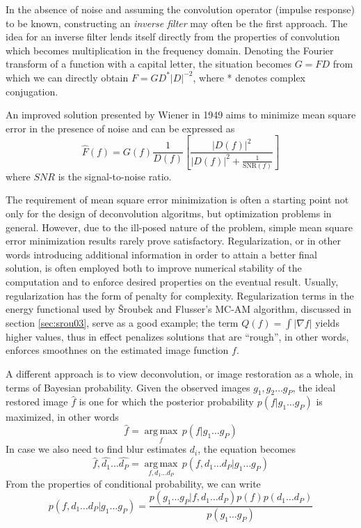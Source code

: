 \documentclass[12pt,notitlepage]{report}
\begin{document}
In the absence of noise and assuming the convolution operator (impulse response) to be known, constructing an {\em inverse filter} may often be the first approach. The idea for an inverse filter lends itself directly from the properties of convolution which becomes multiplication in the frequency domain. Denoting the Fourier transform of a function with a capital letter, the situation becomes $G = FD$ from which we can directly obtain $F = GD^{*}|D|^{-2}$, where * denotes complex conjugation. 

An improved solution presented by Wiener in 1949 aims to minimize mean square error in the presence of noise and can be expressed as 
\begin{equation}
	\label{eq:wiener_deconvolution}
		\hat{F}(f) = G(f) \frac{1}{D(f)} \left[ \frac{ |D(f)|^2 }{ |D(f)|^2 + \frac{1}{\mathrm{SNR}(f)}} \right]
\end{equation}
where $SNR$ is the signal-to-noise ratio. 

The requirement of mean square error minimization is often a starting point not only for the design of deconvolution algoritms, but optimization problems in general. However, due to the ill-posed nature of the problem, simple mean square error minimization results rarely prove satisfactory. Regularization, or in other words introducing additional information in order to attain a better final solution, is often employed both to improve numerical stability of the computation and to enforce desired properties on the eventual result. Usually, regularization has the form of penalty for complexity. Regularization terms in the energy functional used by Šroubek and Flusser's MC-AM algorithm, discussed in section \ref{sec:srou03}, serve as a good example; the term $Q(f) = \int |\nabla f|$ yields higher values, thus in effect penalizes solutions that are ``rough'', in other words, enforces smoothnes on the estimated image function $f$.        	 

A different approach is to view deconvolution, or image restoration as a whole, in terms of Bayesian probability. Given the observed images $g_1, g_2 \dots g_P$, the ideal restored image $\hat{f}$ is one for which the posterior probability $p(f|g_1 \dots g_P)$ is maximized, in other words 
\begin{equation}
	\label{eq:posterior_prob}
		\hat{f} = \underset{f}{\operatorname{arg\,max}} \, p(f|g_1 \dots g_P)
\end{equation}
In case we also need to find blur estimates $d_i$, the equation becomes 
\begin{equation}
	\label{eq:posterior_prob_ext}
		\hat{f},\hat{d_1} \dots \hat{d_P} = \underset{f,d_1 \dots d_P}{\operatorname{arg\,max}} \, p(f,d_1 \dots d_P |g_1 \dots g_P)
\end{equation}
From the properties of conditional probability, we can write 
\begin{equation}
	\label{eq:posterior_prob_prop}
		 p(f,d_1 \dots d_P |g_1 \dots g_P) = \frac{p(g_1 \dots g_P|f,d_1 \dots d_P)p(f)p(d_1 \dots d_P)}{p(g_1 \dots g_P)}
\end{equation}
\end{document}
